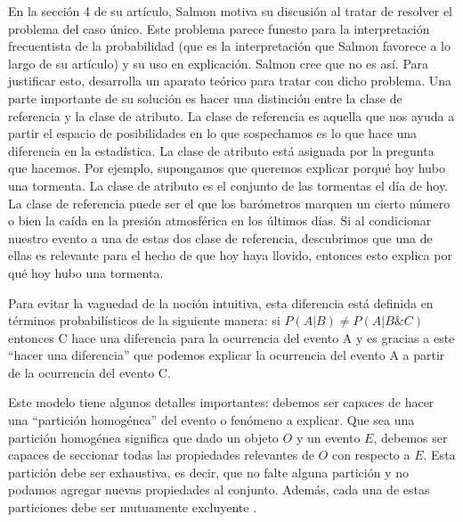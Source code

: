{En la sección 4 de su artículo, Salmon motiva su discusión al tratar de resolver el problema del caso único. Este problema parece funesto para la interpretación frecuentista de la probabilidad (que es la interpretación que Salmon favorece a lo largo de su artículo) y su uso en explicación. Salmon cree que no es así. Para justificar esto, desarrolla un aparato teórico para tratar con dicho problema. Una parte importante de su solución es hacer una distinción entre la clase de referencia y la clase de atributo. La clase de referencia es aquella que nos ayuda a partir el espacio de posibilidades en lo que sospechamos es lo que hace una diferencia en la estadística. La clase de atributo está asignada por la pregunta que hacemos. Por ejemplo, supongamos que queremos explicar porqué hoy hubo una tormenta. La clase de atributo es el conjunto de las tormentas el día de hoy. La clase de referencia puede ser el que los barómetros marquen un cierto número o bien la caída en la presión atmosférica en los últimos días. Si al condicionar nuestro evento a una de estas dos clase de referencia, descubrimos que una de ellas es relevante para el hecho de que hoy haya llovido, entonces esto explica por qué hoy hubo una tormenta.

Para evitar la vaguedad de la noción intuitiva, esta diferencia está definida en términos probabilísticos de la siguiente manera: si $P(A|B) \neq P(A|B\&C)$ entonces C hace una diferencia para la ocurrencia del evento A y es gracias a este ``hacer una diferencia'' que podemos explicar la ocurrencia del evento A a partir de la ocurrencia del evento C.

Este modelo tiene algunos detalles importantes: debemos ser capaces de hacer una ``partición homogénea'' del evento o fenómeno a explicar. Que sea una partición homogénea significa que dado un objeto $O$ y un evento $E$, debemos ser capaces de seccionar todas las propiedades relevantes de $O$ con respecto a $E$. Esta partición debe ser exhaustiva, es decir, que no falte alguna partición y no podamos agregar nuevas propiedades al conjunto. Además, cada una de estas particiones debe ser mutuamente excluyente \cite{Woodward2019}.

}
